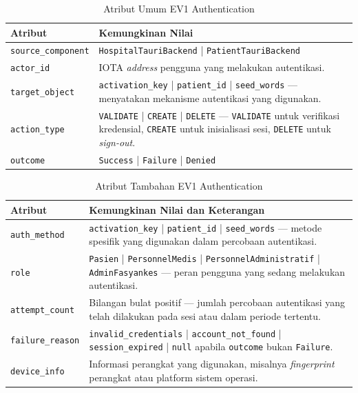 \begin{table}[htbp]
\centering
\caption{Atribut Umum EV1 Authentication}
\label{tab:ev1-umum}
\renewcommand{\arraystretch}{1.3}
\begin{tabular}{|p{3.5cm}|p{8.5cm}|}
\hline
\textbf{Atribut} & \textbf{Kemungkinan Nilai} \\
\hline
\texttt{source\_component} &
\texttt{HospitalTauriBackend} | \texttt{PatientTauriBackend} \\
\hline
\texttt{actor\_id} &
IOTA \textit{address} pengguna yang melakukan autentikasi. \\
\hline
\texttt{target\_object} &
\texttt{activation\_key} | \texttt{patient\_id} | \texttt{seed\_words}
--- menyatakan mekanisme autentikasi yang digunakan. \\
\hline
\texttt{action\_type} &
\texttt{VALIDATE} | \texttt{CREATE} | \texttt{DELETE} --- \texttt{VALIDATE}
untuk verifikasi kredensial, \texttt{CREATE} untuk inisialisasi sesi,
\texttt{DELETE} untuk \textit{sign-out}. \\
\hline
\texttt{outcome} &
\texttt{Success} | \texttt{Failure} | \texttt{Denied} \\
\hline
\end{tabular}
\end{table}

\begin{table}[htbp]
\centering
\caption{Atribut Tambahan EV1 Authentication}
\label{tab:ev1-detail}
\renewcommand{\arraystretch}{1.3}
\begin{tabular}{|p{4cm}|p{7.5cm}|}
\hline
\textbf{Atribut} & \textbf{Kemungkinan Nilai dan Keterangan} \\
\hline
\texttt{auth\_method} &
\texttt{activation\_key} | \texttt{patient\_id} | \texttt{seed\_words}
--- metode spesifik yang digunakan dalam percobaan autentikasi. \\
\hline
\texttt{role} &
\texttt{Pasien} | \texttt{PersonnelMedis} | \texttt{PersonnelAdministratif}
| \texttt{AdminFasyankes} --- peran pengguna yang sedang melakukan autentikasi. \\
\hline
\texttt{attempt\_count} &
Bilangan bulat positif --- jumlah percobaan autentikasi yang telah dilakukan
pada sesi atau dalam periode tertentu. \\
\hline
\texttt{failure\_reason} &
\texttt{invalid\_credentials} | \texttt{account\_not\_found} |
\texttt{session\_expired} | \texttt{null} apabila \texttt{outcome} bukan
\texttt{Failure}. \\
\hline
\texttt{device\_info} &
Informasi perangkat yang digunakan, misalnya \textit{fingerprint} perangkat
atau platform sistem operasi. \\
\hline
\end{tabular}
\end{table}

